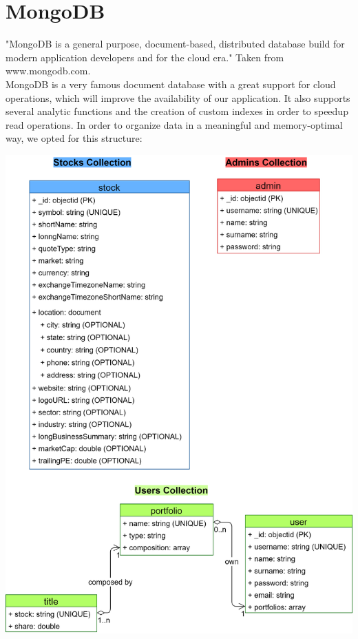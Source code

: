 \section{MongoDB}
"MongoDB is a general purpose, document-based, distributed database build
for modern application developers and for the cloud era." Taken from www.mongodb.com.\\
MongoDB is a very famous document database with a great support for cloud operations, which 
will improve the availability of our application. It also supports several analytic functions
and the creation of custom indexes in order to speedup read operations.
In order to organize data in a meaningful and memory-optimal way, we opted for this structure:

\hfill \break
{\centering
\includegraphics[scale=0.14]{img/mongoDB_schema.png}\\
}

